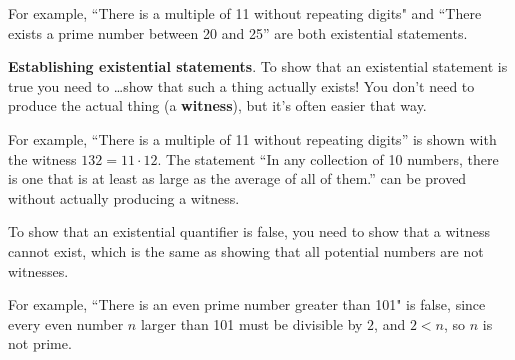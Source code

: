 \documentclass[11pt]{article}
\theoremstyle{definition}
\numberwithin{thm}{section}
\begin{document}
For example, ``There is a multiple of 11 without repeating digits" and ``There exists a prime number between 20 and 25'' are both existential statements.

\textbf{Establishing existential statements}. To show that an existential statement is true you need to \ldots show that such a thing actually exists! You don't need to produce the actual thing (a \textbf{witness}), but it's often easier that way.

For example, ``There is a multiple of 11 without repeating digits'' is shown with the witness $132 = 11 \cdot 12$. The statement ``In any collection of 10 numbers, there is one that is at least as large as the average of all of them.'' can be proved without actually producing a witness.

To show that an existential quantifier is false, you need to show that a witness cannot exist, which is the same as showing that all potential numbers are not witnesses.

For example, ``There is an even prime number greater than 101" is false, since every even number $n$ larger than 101 must be divisible by $2$, and $2<n$, so $n$ is not prime.
\end{document}
